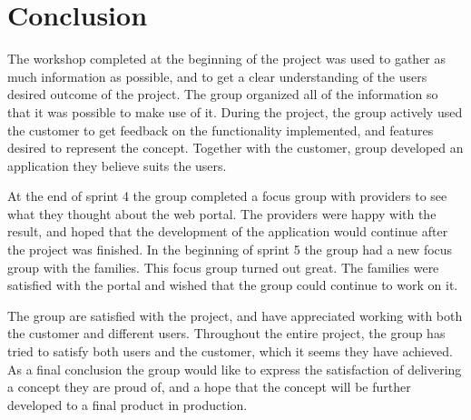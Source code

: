 \section{Conclusion}
The workshop completed at the beginning of the project was used to gather as much information as possible, and to get a clear understanding of the users desired outcome of the project. The group organized all of the information so that it was possible to make use of it. During the project, the group actively used the customer to get feedback on the functionality implemented, and features desired to represent the concept. Together with the customer, group developed an application they believe suits the users. 

At the end of sprint 4 the group completed a focus group with providers to see what they thought about the web portal. The providers were happy with the result, and hoped that the development of the application would continue after the project was finished. In the beginning of sprint 5 the group had a new focus group with the families. This focus group turned out great. The families were satisfied with the portal and wished that the group could continue to work on it. 

The group are satisfied with the project, and have appreciated working with both the customer and different users. Throughout the entire project, the group has tried to satisfy both users and the customer, which it seems they have achieved. As a final conclusion the group would like to express the satisfaction of delivering a concept they are proud of, and a hope that the concept will be further developed to a final product in production.



\cleardoublepage
